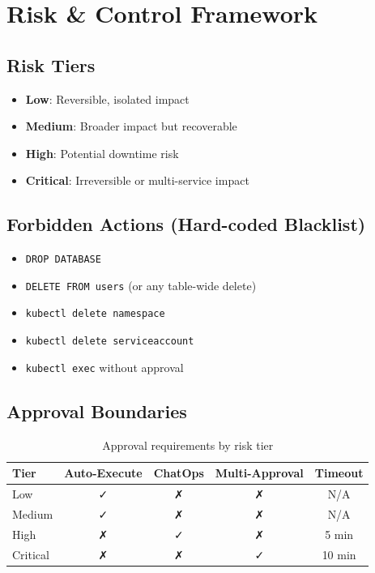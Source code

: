 \documentclass[11pt,a4paper]{article}
\begin{document}
\section{Risk \& Control Framework}

\subsection{Risk Tiers}
\begin{itemize}
    \item \textbf{Low}: Reversible, isolated impact
    \item \textbf{Medium}: Broader impact but recoverable
    \item \textbf{High}: Potential downtime risk
    \item \textbf{Critical}: Irreversible or multi-service impact
\end{itemize}

\subsection{Forbidden Actions (Hard-coded Blacklist)}
\begin{itemize}
    \item \texttt{DROP DATABASE}
    \item \texttt{DELETE FROM users} (or any table-wide delete)
    \item \texttt{kubectl delete namespace}
    \item \texttt{kubectl delete serviceaccount}
    \item \texttt{kubectl exec} without approval
\end{itemize}

\subsection{Approval Boundaries}

\begin{table}[h]
\centering
\begin{tabular}{@{}lcccc@{}}
\toprule
\textbf{Tier} & \textbf{Auto-Execute} & \textbf{ChatOps} & \textbf{Multi-Approval} & \textbf{Timeout} \\ \midrule
Low      & ✓ & ✗ & ✗ & N/A \\
Medium   & ✓ & ✗ & ✗ & N/A \\
High     & ✗ & ✓ & ✗ & 5 min \\
Critical & ✗ & ✗ & ✓ & 10 min \\ \bottomrule
\end{tabular}
\caption{Approval requirements by risk tier}
\end{table}
\end{document}
